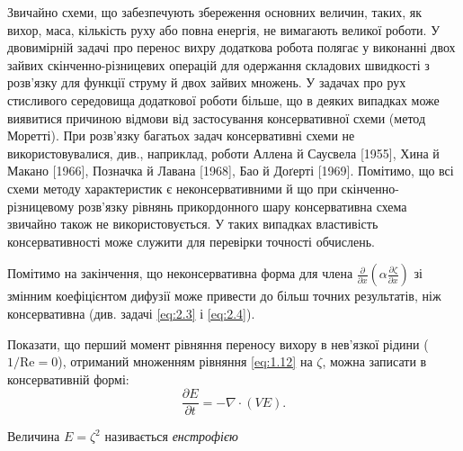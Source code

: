 Звичайно схеми, що забезпечують збереження основних величин, таких, як вихор, маса, кількість руху або повна енергія, не вимагають великої роботи. У двовимірній задачі про перенос вихру додаткова робота полягає у виконанні двох зайвих скінченно-різницевих операцій для одержання складових швидкості з розв'язку для функції струму й двох зайвих множень. У задачах про рух стисливого середовища додаткової роботи більше, що в деяких випадках може виявитися причиною відмови від застосування консервативної схеми (метод Моретті). При розв'язку багатьох задач консервативні схеми не використовувалися, див., наприклад, роботи Аллена й Саусвела [1955], Хина й Макано [1966], Позначка й Лавана [1968], Бао й Доґерті [1969]. Помітимо, що всі схеми методу характеристик є неконсервативними й що при скінченно-різницевому розв'язку рівнянь прикордонного шару консервативна схема звичайно також не використовується. У таких випадках властивість консервативності може служити для перевірки точності обчислень. \medskip

Помітимо на закінчення, що неконсервативна форма для члена $\frac{\partial}{\partial x} \left( \alpha \frac{\partial \zeta}{\partial x} \right)$ зі змінним коефіцієнтом дифузії може привести до більш точних результатів, ніж консервативна (див. задачі \eqref{eq:2.3} і \eqref{eq:2.4}).

\begin{exercise}
    Показати, що перший момент рівняння переносу вихору в нев'язкої рідини ($1 / \text{Re} = 0$), отриманий множенням рівняння \eqref{eq:1.12} на $\zeta$, можна записати в консервативній формі:
    \begin{equation*}
        \frac{\partial E}{\partial t} = - \nabla \cdot (V E).
    \end{equation*}
\end{exercise}
\begin{definition}
    Величина $E = \zeta^2$ називається \textit{енстрофією}
\end{definition}
